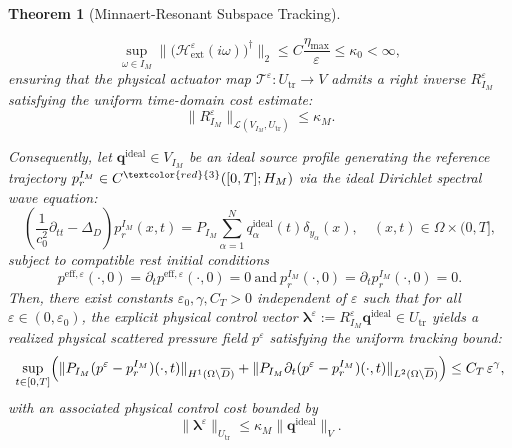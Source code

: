 \documentclass[11pt,a4paper]{article}
\numberwithin{equation}{section}
\newtheorem{theorem}{Theorem}[section]
\begin{document}
\begin{theorem}[Minnaert-Resonant Subspace Tracking]
\begin{enumerate}[(i)]
    \begin{equation}
    \label{eq:Hext-right-inverse-bound-thm}
        \sup_{\omega\in I_M} \|\bigl(\mathcal{H}_{\mathrm{ext}}^\varepsilon(i\omega)\bigr)^\dagger\|_2 \le C\frac{\eta_{\max}}{\varepsilon} \le \kappa_0 < \infty,
    \end{equation}
    ensuring that the physical actuator map $\mathcal{T}^\varepsilon: U_{\mathrm{tr}} \to V$ admits a right inverse $R_{I_M}^\varepsilon$ satisfying the uniform time-domain cost estimate:
    \begin{equation}
        \|R_{I_M}^\varepsilon\|_{\mathcal{L}(V_{I_M},U_{\mathrm{tr}})} \le \kappa_M.
    \end{equation}
\end{enumerate}
Consequently, let $\mathbf{q}^{\mathrm{ideal}} \in V_{I_M}$ be an ideal source profile generating the reference trajectory $p_r^{I_M} \in C^{\textcolor{red}{3}}([0,T]; H_M)$ via the ideal Dirichlet spectral wave equation:
\begin{equation}\label{ref-pressure}
    \left(\frac{1}{c_0^2}\partial_{tt} - \Delta_D\right) p_r^{I_M}(x,t) = P_{I_M} \sum_{\alpha=1}^N q^{\mathrm{ideal}}_\alpha(t)\delta_{y_\alpha}(x), \quad (x,t) \in \Omega \times (0,T],
\end{equation}
subject to compatible rest initial conditions $$p^{\mathrm{eff},\varepsilon}(\cdot,0) = \partial_t p^{\mathrm{eff},\varepsilon}(\cdot,0) = 0\ \text{and} \ p_r^{I_M}(\cdot,0) = \partial_t p_r^{I_M}(\cdot,0) = 0.$$ 
Then, there exist constants $\varepsilon_0, \gamma, C_T > 0$ independent of $\varepsilon$ such that for all $\varepsilon \in (0,\varepsilon_0)$, the explicit physical control vector $\boldsymbol{\lambda}^\varepsilon := R_{I_M}^\varepsilon \mathbf{q}^{\mathrm{ideal}} \in U_{\mathrm{tr}}$ yields a realized physical scattered pressure field $p^\varepsilon$ satisfying the uniform tracking bound:
\begin{equation}
\label{eq:Minnaert-tracking-final}
    \sup_{t\in[0,T]} \Bigl( \|P_{I_M} (p^\varepsilon - p_r^{I_M})(\cdot,t)\|_{H^1(\Omega\setminus \overline{D})} + \|P_{I_M} \partial_t (p^\varepsilon - p_r^{I_M})(\cdot,t)\|_{L^2(\Omega\setminus \overline{D})} \Bigr) \le C_T\,\varepsilon^\gamma,
\end{equation}
with an associated physical control cost bounded by 
$$\|\boldsymbol{\lambda}^\varepsilon\|_{U_{\mathrm{tr}}} \le \kappa_M \|\mathbf{q}^{\mathrm{ideal}}\|_V.$$  

\end{theorem}
\end{document}
